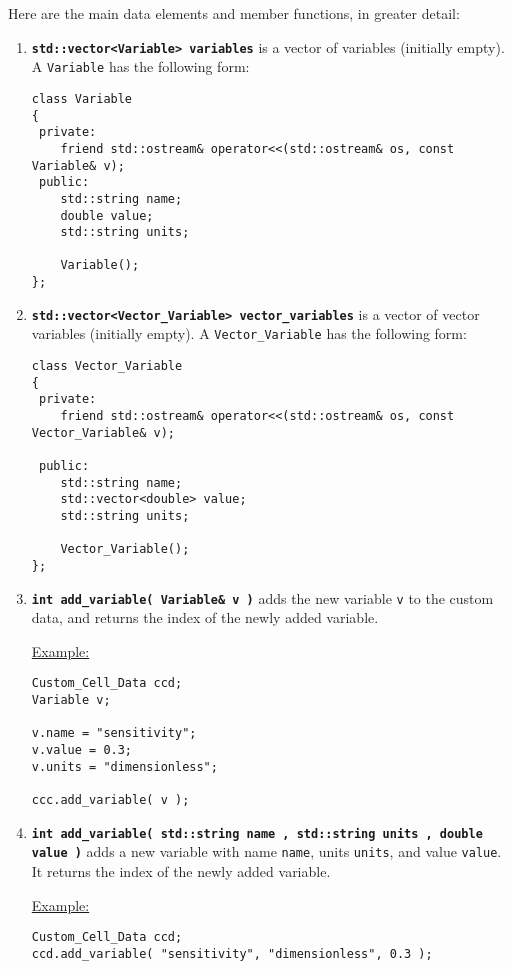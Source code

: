 \documentclass[12pt]{article}
\renewcommand{\v}{\verb}
\newcommand{\smallcode}[1]{\textbf{\texttt{#1}}}
\begin{document}
Here are the main data elements and member functions, in 
greater detail: 

\begin{enumerate}
\item 
\smallcode{std::vector<Variable> variables} is a vector of variables (initially empty). A 
\v|Variable| has the following form: 

\begin{verbatim}
class Variable
{
 private:
    friend std::ostream& operator<<(std::ostream& os, const Variable& v);  
 public:
    std::string name; 
    double value; 
    std::string units; 
    
    Variable(); 
};
\end{verbatim}

\item 
\smallcode{std::vector<Vector\_Variable> vector\_variables} is a vector of vector variables (initially empty). A 
\v|Vector_Variable| has the following form: 

\begin{verbatim}
class Vector_Variable
{
 private:
    friend std::ostream& operator<<(std::ostream& os, const Vector_Variable& v);   
    
 public:
    std::string name; 
    std::vector<double> value; 
    std::string units; 
    
    Vector_Variable(); 
};
\end{verbatim}

\item 
\smallcode{int add\_variable( Variable\& v )} adds the new variable \v|v| to the 
custom data, and returns the index of the newly added variable. 

\underline{Example:}
\begin{verbatim}
Custom_Cell_Data ccd; 
Variable v; 

v.name = "sensitivity"; 
v.value = 0.3; 
v.units = "dimensionless"; 

ccc.add_variable( v ); 
\end{verbatim}

\item 
\smallcode{int add\_variable( std::string name , std::string units , double value )} 
adds a new variable with name \v|name|, units \v|units|, and value \v|value|. It 
returns the index of the newly added variable. 

\underline{Example:} 
\begin{verbatim}
Custom_Cell_Data ccd; 
ccd.add_variable( "sensitivity", "dimensionless", 0.3 ); 
\end{verbatim}


\end{enumerate}
\end{document}
